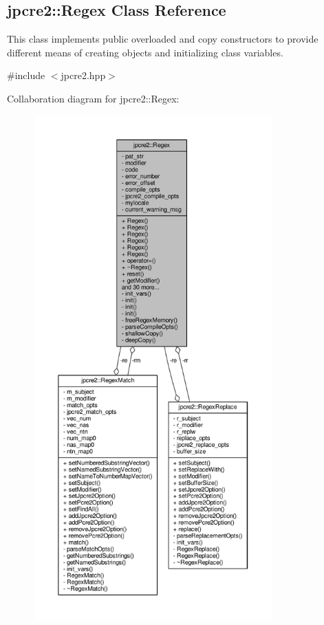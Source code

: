 \hypertarget{classjpcre2_1_1Regex}{}\subsection{jpcre2\+:\+:Regex Class Reference}
\label{classjpcre2_1_1Regex}


This class implements public overloaded and copy constructors to provide different means of creating objects and initializing class variables.  




{\ttfamily \#include $<$jpcre2.\+hpp$>$}



Collaboration diagram for jpcre2\+:\+:Regex\+:\nopagebreak
\begin{figure}[H]
\begin{center}
\leavevmode
\includegraphics[height=550pt]{classjpcre2_1_1Regex__coll__graph}
\end{center}
\end{figure}
